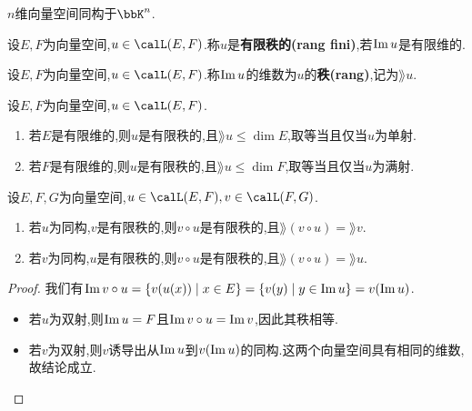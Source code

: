 \begin{cor}
    $n$维向量空间同构于$\bbK^n$.
\end{cor}

\begin{deff}
    设$E, F$为向量空间,$u \in \calL(E, F)$.称$u$是\textbf{有限秩的(rang fini)},若$\operatorname{Im} u$是有限维的.
\end{deff}

\begin{deff}
    设$E, F$为向量空间,$u \in \calL(E, F)$.称$\operatorname{Im} u$的维数为$u$的\textbf{秩(rang)},记为$\rang u$.
\end{deff}

\begin{rqq}
    设$E, F$为向量空间,$u \in \calL(E, F)$.

    \begin{enumerate}
        \item 若$E$是有限维的,则$u$是有限秩的,且$\rang u \leqslant \dim E$,取等当且仅当$u$为单射.
        \item 若$F$是有限维的,则$u$是有限秩的,且$\rang u \leqslant \dim F$,取等当且仅当$u$为满射.
    \end{enumerate}
\end{rqq}

\begin{prop}
    设$E, F, G$为向量空间,$u \in \calL(E, F), v \in \calL(F, G)$.

    \begin{enumerate}
        \item 若$u$为同构,$v$是有限秩的,则$v \circ u$是有限秩的,且$\rang (v \circ u) = \rang v$.
        \item 若$v$为同构,$u$是有限秩的,则$v \circ u$是有限秩的,且$\rang (v \circ u) = \rang u$.
    \end{enumerate}
\end{prop}

\begin{proof}
    我们有$\operatorname{Im} v \circ u = \{ v(u(x)) \mid x \in E \} = \{ v(y) \mid y \in \operatorname{Im} u \} = v(\operatorname{Im} u)$.

    \begin{itemize}
        \item 若$u$为双射,则$\operatorname{Im} u = F$且$\operatorname{Im} v \circ u = \operatorname{Im} v$,因此其秩相等.
        \item 若$v$为双射,则$v$诱导出从$\operatorname{Im} u$到$v(\operatorname{Im} u)$的同构.这两个向量空间具有相同的维数,故结论成立.
    \end{itemize}
\end{proof}

